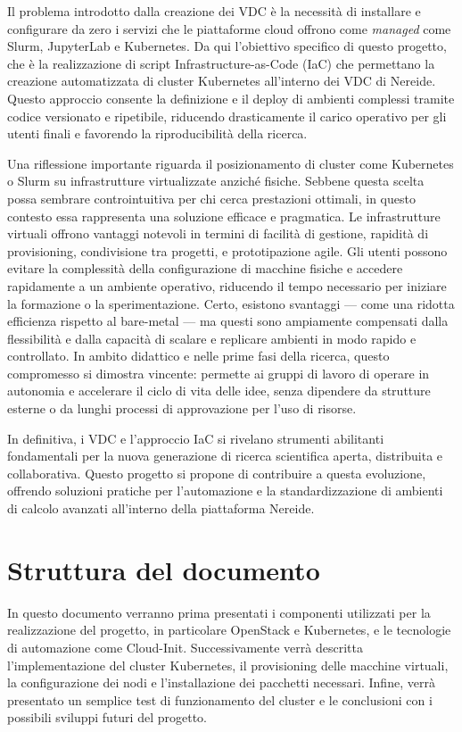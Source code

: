 \documentclass[12pt,a4paper,openright,twoside]{book}
\begin{document}
Il problema introdotto dalla creazione dei VDC è la necessità di installare e configurare da zero i servizi che le piattaforme cloud offrono come \textit{managed} come Slurm, JupyterLab e Kubernetes. 
Da qui l'obiettivo specifico di questo progetto, che è la realizzazione di script Infrastructure-as-Code (IaC) che permettano la creazione automatizzata di cluster Kubernetes all'interno dei VDC di Nereide.
Questo approccio consente la definizione e il deploy di ambienti complessi tramite codice versionato e ripetibile, riducendo drasticamente il carico operativo per gli utenti finali e favorendo la riproducibilità della ricerca.

Una riflessione importante riguarda il posizionamento di cluster come Kubernetes o Slurm su infrastrutture virtualizzate anziché fisiche.
Sebbene questa scelta possa sembrare controintuitiva per chi cerca prestazioni ottimali, in questo contesto essa rappresenta una soluzione efficace e pragmatica.
Le infrastrutture virtuali offrono vantaggi notevoli in termini di facilità di gestione, rapidità di provisioning, condivisione tra progetti, e prototipazione agile.
Gli utenti possono evitare la complessità della configurazione di macchine fisiche e accedere rapidamente a un ambiente operativo, riducendo il tempo necessario per iniziare la formazione o la sperimentazione.
Certo, esistono svantaggi — come una ridotta efficienza rispetto al bare-metal — ma questi sono ampiamente compensati dalla flessibilità e dalla capacità di scalare e replicare ambienti in modo rapido e controllato.
In ambito didattico e nelle prime fasi della ricerca, questo compromesso si dimostra vincente: permette ai gruppi di lavoro di operare in autonomia e accelerare il ciclo di vita delle idee, senza dipendere da strutture
esterne o da lunghi processi di approvazione per l'uso di risorse.

In definitiva, i VDC e l'approccio IaC si rivelano strumenti abilitanti fondamentali per la nuova generazione di ricerca scientifica aperta, distribuita e collaborativa.
Questo progetto si propone di contribuire a questa evoluzione, offrendo soluzioni pratiche per l'automazione e la standardizzazione di ambienti di calcolo avanzati all'interno della piattaforma Nereide.

\section{Struttura del documento}
In questo documento verranno prima presentati i componenti utilizzati per la realizzazione del progetto, in particolare OpenStack e Kubernetes, e le tecnologie di automazione come Cloud-Init.
Successivamente verrà descritta l'implementazione del cluster Kubernetes, il provisioning delle macchine virtuali, la configurazione dei nodi e l'installazione dei pacchetti necessari.
Infine, verrà presentato un semplice test di funzionamento del cluster e le conclusioni con i possibili sviluppi futuri del progetto.
\end{document}
